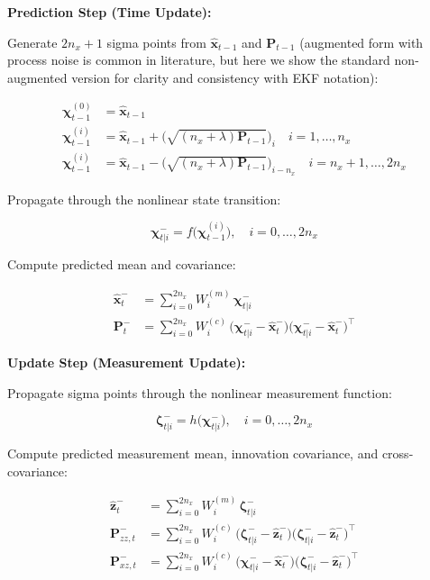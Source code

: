 \documentclass{article}
\renewcommand{\v}[1]{ \ensuremath{ {\mathbf{#1}} }}
\begin{document}
\textbf{Prediction Step (Time Update):}

Generate $2n_x + 1$ sigma points from $\hat{\v x}_{t-1}$ and $\v P_{t-1}$ (augmented form with process noise is common in literature, but here we show the standard non-augmented version for clarity and consistency with EKF notation):

\begin{align}
\v{\chi}_{t-1}^{(0)} &= \hat{\v x}_{t-1} \\
\v{\chi}_{t-1}^{(i)} &= \hat{\v x}_{t-1} + \bigl(\sqrt{(n_x + \lambda) \v P_{t-1}}\bigr)_i \quad i=1,\dots,n_x \\
\v{\chi}_{t-1}^{(i)} &= \hat{\v x}_{t-1} - \bigl(\sqrt{(n_x + \lambda) \v P_{t-1}}\bigr)_{i-n_x} \quad i=n_x+1,\dots,2n_x
\end{align}

Propagate through the nonlinear state transition:

\begin{equation}
\v{\chi}_{t|i}^{-} = f\bigl( \v{\chi}_{t-1}^{(i)} \bigr), \quad i=0,\dots,2n_x
\end{equation}

Compute predicted mean and covariance:

\begin{align}
\hat{\v x}_{t}^{-} &= \sum_{i=0}^{2n_x} W_i^{(m)} \, \v{\chi}_{t|i}^{-} \\
\v P_{t}^{-} &= \sum_{i=0}^{2n_x} W_i^{(c)} \, \bigl( \v{\chi}_{t|i}^{-} - \hat{\v x}_{t}^{-} \bigr) \bigl( \v{\chi}_{t|i}^{-} - \hat{\v x}_{t}^{-} \bigr)^\top
\end{align}

\textbf{Update Step (Measurement Update):}

Propagate sigma points through the nonlinear measurement function:

\begin{equation}
\v{\zeta}_{t|i}^{-} = h\bigl( \v{\chi}_{t|i}^{-} \bigr), \quad i=0,\dots,2n_x
\end{equation}

Compute predicted measurement mean, innovation covariance, and cross-covariance:

\begin{align}
\hat{\v z}_{t}^{-} &= \sum_{i=0}^{2n_x} W_i^{(m)} \, \v{\zeta}_{t|i}^{-} \\
\v P_{zz,t}^{-} &= \sum_{i=0}^{2n_x} W_i^{(c)} \, \bigl( \v{\zeta}_{t|i}^{-} - \hat{\v z}_{t}^{-} \bigr) \bigl( \v{\zeta}_{t|i}^{-} - \hat{\v z}_{t}^{-} \bigr)^\top \\
\v P_{xz,t}^{-} &= \sum_{i=0}^{2n_x} W_i^{(c)} \, \bigl( \v{\chi}_{t|i}^{-} - \hat{\v x}_{t}^{-} \bigr) \bigl( \v{\zeta}_{t|i}^{-} - \hat{\v z}_{t}^{-} \bigr)^\top
\end{align}
\end{document}
